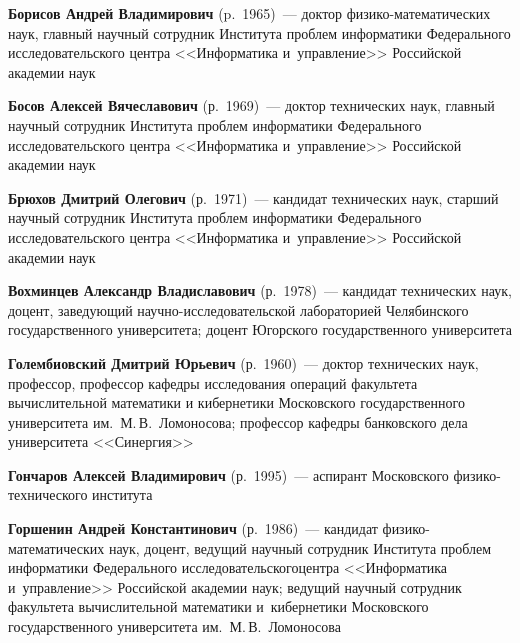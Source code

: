 \begin{multicols}{2}



\noindent
\textbf{Борисов Андрей Владимирович} (p.\ 1965)~--- 
доктор фи\-зи\-ко-ма\-те\-ма\-ти\-че\-ских 
наук, главный научный сотрудник Института проб\-лем информатики 
Федерального исследовательского центра <<Информатика и~управ\-ле\-ние>>
Российской академии наук


\noindent
\textbf{Босов Алексей Вячеславович} (р.\ 1969)~--- 
доктор технических наук, главный научный сотрудник Института проб\-лем 
информатики Федерального исследовательского центра <<Информатика и~управ\-ле\-ние>>
 Российской академии наук
 
 
 \noindent
\textbf{Брюхов Дмитрий Олегович} (р.\ 1971)~--- 
кандидат технических наук, старший научный сотрудник Института проб\-лем 
информатики Федерального исследовательского центра <<Информатика 
и~\mbox{управ\-ле\-ние}>>
 Российской академии наук
 
 
 \noindent
\textbf{Вохминцев Александр Владиславович} (р.\ 1978)~--- 
кандидат технических наук, доцент, за\-ве\-ду\-ющий на\-уч\-но-ис\-сле\-до\-ва\-тель\-ской 
лабораторией Челябинского государственного университета;
 доцент Югорского государственного университета

 
 \noindent
 \textbf{Голембиовский Дмитрий Юрьевич} (р.\ 1960)~--- 
доктор технических наук, профессор, профессор кафедры исследования 
операций факультета вычислительной математики и кибернетики 
Московского государственного университета им.\ М.\,В.~Ломоносова; 
профессор кафедры банковского дела университета <<Синергия>>


\noindent
\textbf{Гончаров Алексей Владимирович} (р.\ 1995)~--- 
аспирант Московского фи\-зи\-ко-тех\-ни\-че\-ско\-го института


\noindent
\textbf{Горшенин Андрей Константинович} (р.\ 1986)~--- 
кандидат фи\-зи\-ко-ма\-те\-ма\-ти\-че\-ских наук, доцент, 
ведущий научный сотрудник
Института проб\-лем информатики Федерального исследовательского\linebreak центра 
<<Информатика и~управ\-ле\-ние>> Российской академии наук;
ведущий научный сотрудник факультета вычислительной математики и~кибернетики
Московского   государственного университета им.\
 М.\,В.~Ломоносова


\end{multicols}
